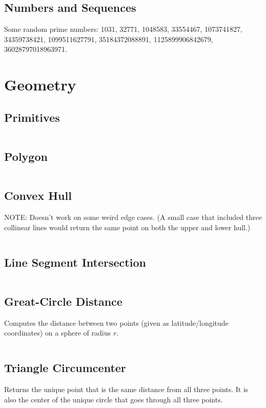 \documentclass[9pt,a4paper,twocolumn,landscape,oneside]{amsart}
\newcommand{\code}[1]{\inputminted{cpp}{_code/#1}}
\newif\ifverbose
\begin{document}
    \subsection{Numbers and Sequences}
        Some random prime numbers: 1031, 32771, 1048583, 33554467,
        1073741827, 34359738421, 1099511627791, 35184372088891,
        1125899906842679, 36028797018963971.

\section{Geometry}
    \subsection{Primitives}
        \ifverbose
        Geometry primitives.
        \fi
        \code{geometry/primitives.cpp}

    \subsection{Polygon}
        \ifverbose
        Polygon primitives.
        \fi
        \code{geometry/polygon.cpp}

    \subsection{Convex Hull}
        \ifverbose
        An algorithm that finds the Convex Hull of a set of points.
        \fi
        NOTE: Doesn't work on some weird edge cases. (A small case that
        included three collinear lines would return the same point on both the
        upper and lower hull.)
        \code{geometry/convex_hull.cpp}

    \subsection{Line Segment Intersection}
        \ifverbose
        Computes the intersection between two line segments.
        \fi
        \code{geometry/line_segment_intersect.cpp}

    \subsection{Great-Circle Distance}
        Computes the distance between two points (given as latitude/longitude
        coordinates) on a sphere of radius $r$.
        \code{geometry/gc_distance.cpp}

    \subsection{Triangle Circumcenter}
        Returns the unique point that is the same distance from all three
        points. It is also the center of the unique circle that goes through
        all three points.
        \code{geometry/circumcenter.cpp}
\end{document}
